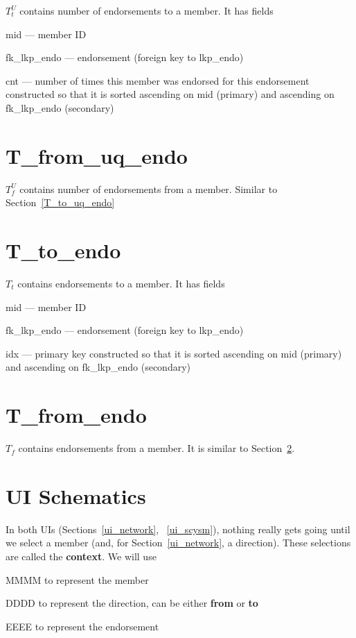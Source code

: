 \(T^U_t\) contains number of endorsements to a member. It has fields
\be
\item mid --- member ID
\item fk\_lkp\_endo --- endorsement (foreign key to lkp\_endo)
\item cnt --- number of times this member was endorsed for this
endorsement
\ee
constructed so that it is sorted ascending on mid (primary) and
ascending on fk\_lkp\_endo (secondary)

\section{T\_from\_uq\_endo}
\label{T_from_uq_endo}

\(T^U_f\) contains number of endorsements from a member. Similar to
Section~\ref{T_to_uq_endo}

\section{T\_to\_endo}
\label{T_to_endo}

\(T_t\) contains endorsements to a member. It has fields
\be
\item mid --- member ID
\item fk\_lkp\_endo --- endorsement (foreign key to lkp\_endo)
\item idx --- primary key
\ee
constructed so that it is sorted ascending on mid (primary) and
ascending on fk\_lkp\_endo (secondary)

\section{T\_from\_endo}
\label{T_from_endo}

\(T_f\) contains endorsements from a member. It is similar to 
Section~\ref{T_to_endo}.

\newpage

\section{UI Schematics}

In both UIs (Sections~\ref{ui_network}, ~\ref{ui_scysm}), 
nothing really gets going until we select a member (and, for
Section~\ref{ui_network}, a direction). These selections are called
the {\bf context}. We will use
\be
\item MMMM to represent the member
\item DDDD to represent the direction, can be either {\bf from} or {\bf
  to}
\item EEEE to represent the endorsement
\ee

